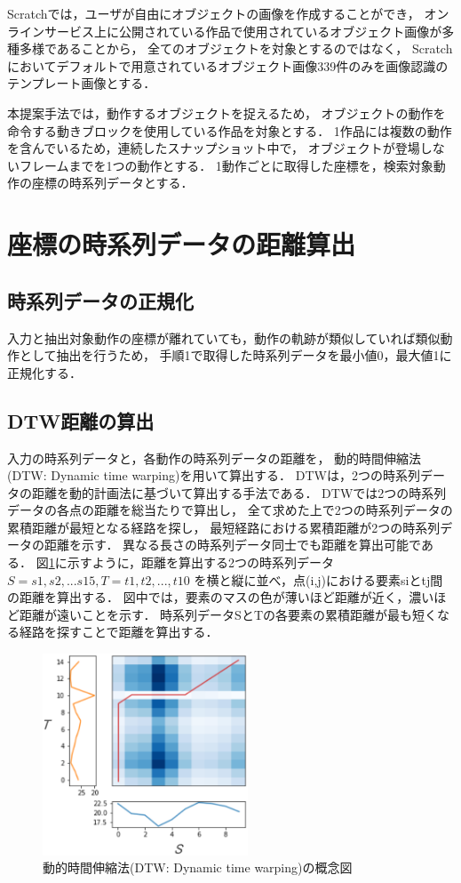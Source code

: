 \documentclass[11pt]{jreport}
\begin{document}
Scratchでは，ユーザが自由にオブジェクトの画像を作成することができ，
オンラインサービス上に公開されている作品で使用されているオブジェクト画像が多種多様であることから，
全てのオブジェクトを対象とするのではなく，
Scratchにおいてデフォルトで用意されているオブジェクト画像339件のみを画像認識のテンプレート画像とする．

本提案手法では，動作するオブジェクトを捉えるため，
オブジェクトの動作を命令する動きブロックを使用している作品を対象とする．
1作品には複数の動作を含んでいるため，連続したスナップショット中で，
オブジェクトが登場しないフレームまでを1つの動作とする．
1動作ごとに取得した座標を，検索対象動作の座標の時系列データとする．

\section{座標の時系列データの距離算出}

\subsection{時系列データの正規化}
入力と抽出対象動作の座標が離れていても，動作の軌跡が類似していれば類似動作として抽出を行うため，
手順1で取得した時系列データを最小値0，最大値1に正規化する．

\subsection{DTW距離の算出}
入力の時系列データと，各動作の時系列データの距離を，
動的時間伸縮法(DTW: Dynamic time warping)を用いて算出する．
DTWは，2つの時系列データの距離を動的計画法に基づいて算出する手法である．
DTWでは2つの時系列データの各点の距離を総当たりで算出し，
全て求めた上で2つの時系列データの累積距離が最短となる経路を探し，
最短経路における累積距離が2つの時系列データの距離を示す．
異なる長さの時系列データ同士でも距離を算出可能である．
図\ref{dtw}に示すように，距離を算出する2つの時系列データ$S=s1,s2,...s15,T=t1,t2,...,t10$
を横と縦に並べ，点(i,j)における要素siとtj間の距離を算出する．
図中では，要素のマスの色が薄いほど距離が近く，濃いほど距離が遠いことを示す．
時系列データSとTの各要素の累積距離が最も短くなる経路を探すことで距離を算出する．

\begin{figure}[H]
    \centering
    \includegraphics[height=6cm]{dtw.eps}
    \caption{動的時間伸縮法(DTW: Dynamic time warping)の概念図}
    \label{dtw}
\end{figure}
\end{document}
